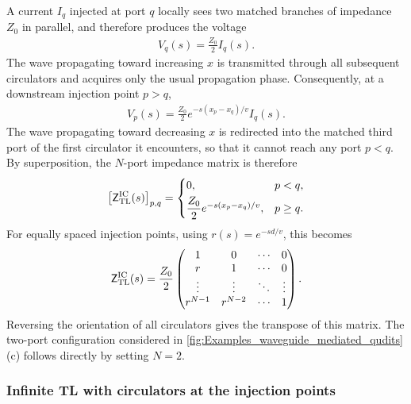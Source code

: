 \documentclass[prx,aps,twocolumn,article]{revtex4-2}
\newcommand{\msf}[1]{\mathsf{#1}}
\newcommand{\msZ}{\msf{Z}}
\newcommand{\msZTL}{\msZ_{\mathrm{TL}}}
\begin{document}
A current $I_q$ injected at port $q$ locally sees two matched branches of impedance $Z_0$ in parallel, and therefore produces the voltage
\begin{align}
    V_q(s)=\frac{Z_0}{2}I_q(s).
\end{align}
The wave propagating toward increasing $x$ is transmitted through all
subsequent circulators and acquires only the usual propagation phase.
Consequently, at a downstream injection point $p>q$,
\begin{align}
    V_p(s)
    =
    \frac{Z_0}{2}
    e^{-s(x_p-x_q)/v}
    I_q(s).
\end{align}
The wave propagating toward decreasing $x$ is redirected into the matched
third port of the first circulator it encounters, so that it cannot reach
any port $p<q$. By superposition, the $N$-port impedance matrix is therefore
\begin{align}
    \left[
        \msZTL^{\rm IC}(s)
    \right]_{p,q}
    =
    \begin{cases}
        0,
        & p<q,
        \\[1mm]
        \dfrac{Z_0}{2}
        e^{-s(x_p-x_q)/v},
        & p\geq q.
    \end{cases}
    \label{Eq:InfiniteTLNPortIntermediateCirculators}
\end{align}
For equally spaced injection points, using
$r(s)=e^{-sd/v}$, this becomes
\begin{align}
    \msZTL^{\rm IC}(s)
    =
    \frac{Z_0}{2}
    \begin{pmatrix}
        1&0&\cdots&0\\
        r&1&\cdots&0\\
        \vdots&\vdots&\ddots&\vdots\\
        r^{N-1}&r^{N-2}&\cdots&1
    \end{pmatrix}.
    \label{Eq:InfiniteTLNPortIntermediateCirculatorsEquallySpaced}
\end{align}
Reversing the orientation of all circulators gives the transpose of this
matrix. The two-port configuration considered in
\cref{fig:Examples_waveguide_mediated_qudits}(c) follows directly by
setting $N=2$.


\subsubsection{Infinite TL with circulators at the injection points}
\end{document}
